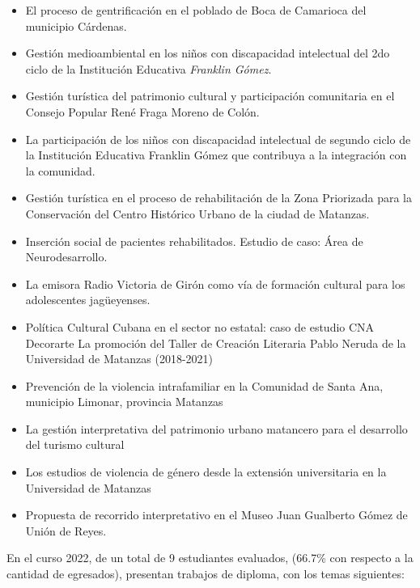 \begin{itemize}
	\setlength\itemsep{-0.5em}
	\item El proceso de gentrificación en el poblado de Boca de Camarioca del municipio Cárdenas. 
	\item Gestión medioambiental en los niños con discapacidad intelectual del 2do ciclo de la Institución Educativa \emph{Franklin Gómez}.
	\item Gestión turística del patrimonio cultural y participación comunitaria en el Consejo Popular René Fraga Moreno de Colón.
	\item La participación de los niños con discapacidad intelectual de segundo ciclo de la Institución Educativa Franklin Gómez que contribuya a la integración con la comunidad.
	\item Gestión turística en el proceso de rehabilitación de la Zona Priorizada para la Conservación del Centro Histórico Urbano de la ciudad de Matanzas.
	\item Inserción social de pacientes rehabilitados. Estudio de caso: Área de Neurodesarrollo.
	\item La emisora Radio Victoria de Girón como vía de formación cultural para los adolescentes jagüeyenses.
	\item Política Cultural Cubana en el sector no estatal: caso de estudio CNA Decorarte
	La promoción del Taller de Creación Literaria Pablo Neruda de la Universidad de Matanzas (2018-2021)  
	\item Prevención de la violencia intrafamiliar en la Comunidad de Santa Ana, municipio Limonar, provincia Matanzas 
	\item La gestión interpretativa del patrimonio urbano matancero para el desarrollo del turismo cultural
	\item Los estudios de violencia de género desde la extensión universitaria en la Universidad de Matanzas
	\item Propuesta de recorrido interpretativo en el Museo Juan Gualberto Gómez de Unión de Reyes. 
\end{itemize}

En el curso 2022, de un total de 9 estudiantes evaluados, (66.7\% con respecto a la cantidad de egresados), presentan trabajos de diploma, con los temas siguientes:  

